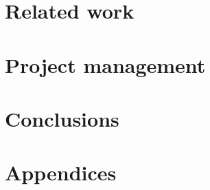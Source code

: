 \documentclass[11pt]{article}
\begin{document}
\section{Related work}
\label{sec:related}


\section{Project management}
\label{sec:project-mgmt}


\section{Conclusions}
\label{sec:conclusions}


\newpage
\printbibliography[heading=bibintoc]

\newpage
\section{Appendices}
\label{sec:appendices}

\end{document}
